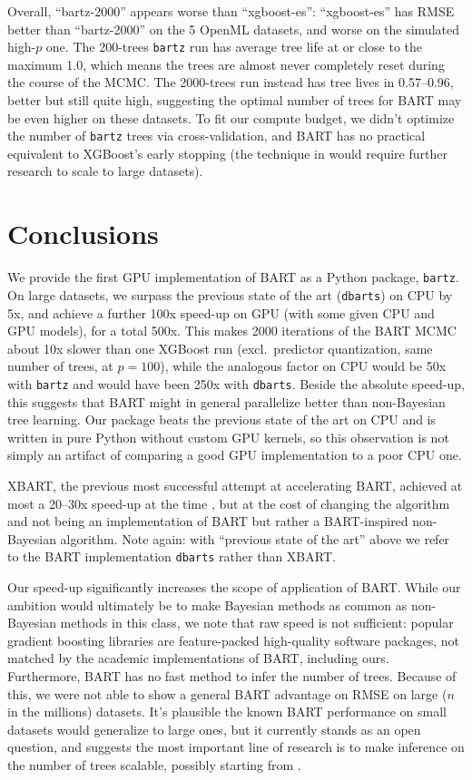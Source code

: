 \documentclass{article}
\begin{document}
Overall, ``bartz-2000'' appears worse than ``xgboost-es'': ``xgboost-es'' has
RMSE better than ``bartz-2000'' on the 5 OpenML datasets, and worse
on the simulated high-$p$ one. The 200-trees \texttt{bartz} run has average tree life at
or close to the maximum 1.0, which means the trees are almost never completely
reset during the course of the MCMC. The 2000-trees run instead has tree lives
in 0.57--0.96, better but still quite high, suggesting the optimal number of
trees for BART may be even higher on these datasets. To fit our compute budget,
we didn't optimize the number of \texttt{bartz} trees via cross-validation, and BART has
no practical equivalent to XGBoost's early stopping (the technique in
\cite[ch.~3]{collins_improved_2023} would
require further research to scale to large datasets).

\section{Conclusions}
\label{sec:conclusions}

We provide the first GPU implementation of BART as a Python package,
\texttt{bartz}. On large datasets, we surpass the previous state of the art
(\texttt{dbarts}) on CPU by 5x, and achieve a further 100x speed-up on GPU (with
some given CPU and GPU models), for a total 500x. This makes 2000 iterations of
the BART MCMC about 10x slower than one XGBoost run (excl.\ predictor
quantization, same number of trees, at $p=100$), while the analogous factor on CPU would be
50x with \texttt{bartz} and would have been 250x with \texttt{dbarts}. Beside
the absolute speed-up, this suggests that BART might in general parallelize better
than non-Bayesian tree learning. Our package beats the previous state of the
art on CPU and is written in pure Python without custom GPU kernels, so this
observation is not simply an artifact of comparing a good GPU implementation to
a poor CPU one.

XBART, the previous most successful attempt at accelerating BART,
achieved at most a 20--30x speed-up at the time \autocite[table~4, p.~560]{he_stochastic_2023}, but at the cost
of changing the algorithm and not being an implementation of BART but rather a
BART-inspired non-Bayesian algorithm. Note again: with ``previous state of the
art'' above we refer to the BART implementation \texttt{dbarts} rather than
XBART.

Our speed-up significantly increases the scope of application of BART. While our
ambition would ultimately be to make Bayesian methods as common as non-Bayesian
methods in this class, we note that raw speed is not sufficient:
popular gradient boosting libraries are
feature-packed high-quality software packages, not matched by the academic
implementations of BART, including ours. Furthermore, BART has no fast
method to infer the number of trees. Because of this, we were not able to show
a general BART advantage on RMSE on large ($n$ in the millions) datasets. It's
plausible the known BART performance on small datasets would generalize to
large ones, but it currently stands as an open question, and suggests the most
important line of research is to make inference on the number of trees
scalable, possibly starting from \textcite{collins_improved_2023}.
\end{document}
